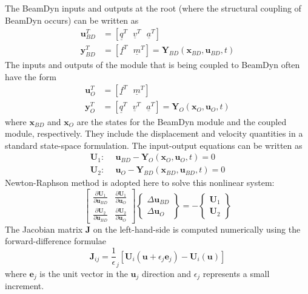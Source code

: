 \documentclass{aiaa-tc}
\renewcommand{\vec}[1]{\underline{#1}}
\begin{document}
The BeamDyn inputs and outputs at the root (where the structural coupling of BeamDyn occurs) can be written as
\begin{align}
    \label{BDInput}
    \mathbf{u}_{BD}^T &= \left[ \vec{q}^T~~~\vec{v}^T~~~\vec{a}^T\right] \\
    \label{BDOutput}
    \mathbf{y}_{BD}^T &= \left[ \vec{f}^T~~~\vec{m}^T \right] = \mathbf{Y}_{BD}(\mathbf{x}_{BD},\mathbf{u}_{BD},t)
\end{align}
The inputs and outputs of the module that is being coupled to BeamDyn often have the form
\begin{align}
    \label{OtherInput}
    \mathbf{u}_{O}^T &= \left[ \vec{f}^T~~~\vec{m}^T \right] \\
    \label{OtherOutput}
    \mathbf{y}_{O}^T &= \left[ \vec{q}^T~~~\vec{v}^T~~~\vec{a}^T\right] = \mathbf{Y}_{O}(\mathbf{x}_{O},\mathbf{u}_{O},t) 
\end{align}
where $\mathbf{x}_{BD}$ and $\mathbf{x}_{O}$ are the states for the BeamDyn module and the coupled module, respectively. They include the displacement and velocity quantities in a standard state-space formulation.
The input-output equations can be written as
\begin{align}
    \label{IOEq1}
    \mathbf{U}_1: ~~&\mathbf{u}_{BD} - \mathbf{Y}_{O}(\mathbf{x}_{O},\mathbf{u}_{O},t) = 0 \\
    \label{IOEq2}
     \mathbf{U}_2: ~~&\mathbf{u}_{O} - \mathbf{Y}_{BD}(\mathbf{x}_{BD},\mathbf{u}_{BD},t) = 0
\end{align}
Newton-Raphson method is adopted here to solve this nonlinear system: 
\begin{equation}
    \label{NREq}
    \begin{bmatrix}
    \frac{\partial \mathbf{U}_1}{\partial \mathbf{u}_{BD}}  &  \frac{\partial \mathbf{U}_{1}}{\partial \mathbf{u}_{O}} \\
    \frac{\partial \mathbf{U}_2}{\partial \mathbf{u}_{BD}}  &  \frac{\partial \mathbf{U}_{2}}{\partial \mathbf{u}_{O}} 
    \end{bmatrix}
    \begin{Bmatrix}
     \Delta \mathbf{u}_{BD} \\
     \Delta \mathbf{u}_{O}
    \end{Bmatrix} 
    =
    -
    \begin{Bmatrix}
     \mathbf{U}_1 \\
     \mathbf{U}_2
    \end{Bmatrix}
\end{equation}
 The Jacobian matrix $\mathbf{J}$ on the left-hand-side is computed numerically using the forward-difference formulae
 \begin{equation}
     \label{Jacobian}
     \mathbf{J}_{ij} = \frac{1}{\epsilon}_j \left[\mathbf{U}_i(\mathbf{u}+\epsilon_j \mathbf{e}_j) - \mathbf{U}_i(\mathbf{u}) \right]
 \end{equation}
 where $\mathbf{e}_j$ is the unit vector in the $\mathbf{u}_j$ direction and $\epsilon_j$ represents a small increment.
 
\end{document}
